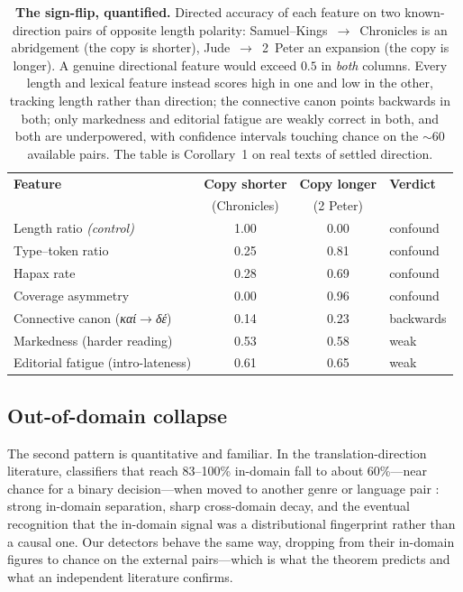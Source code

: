 \documentclass[11pt,letterpaper]{article}
\newcommand{\gk}[1]{{\greekfont\itshape #1}}
\newcommand{\tblhead}{\rowcolor{marine!12}}
\begin{document}
\begin{table}[H]
\centering\small
\begin{tabular}{L{5.0cm}ccl}
\toprule
\tblhead\textbf{Feature} & \textbf{Copy shorter} & \textbf{Copy longer} & \textbf{Verdict} \\
\tblhead & \footnotesize (Chronicles) & \footnotesize (2 Peter) & \\
\midrule
Length ratio \emph{(control)} & 1.00 & 0.00 & confound \\
Type--token ratio & 0.25 & 0.81 & confound \\
Hapax rate & 0.28 & 0.69 & confound \\
Coverage asymmetry & 0.00 & 0.96 & confound \\
Connective canon (\gk{καί}$\to$\gk{δέ}) & 0.14 & 0.23 & backwards \\
Markedness (harder reading) & 0.53 & 0.58 & weak \\
Editorial fatigue (intro-lateness) & 0.61 & 0.65 & weak \\
\bottomrule
\end{tabular}
\caption{\textbf{The sign-flip, quantified.} Directed accuracy of each feature on two known-direction pairs of opposite length polarity: Samuel--Kings~$\to$~Chronicles is an abridgement (the copy is shorter), Jude~$\to$~2~Peter an expansion (the copy is longer). A genuine directional feature would exceed $0.5$ in \emph{both} columns. Every length and lexical feature instead scores high in one and low in the other, tracking length rather than direction; the connective canon points backwards in both; only markedness and editorial fatigue are weakly correct in both, and both are underpowered, with confidence intervals touching chance on the $\sim$60 available pairs. The table is Corollary~1 on real texts of settled direction.}
\label{tab:signflip}
\end{table}

\subsection{Out-of-domain collapse}

The second pattern is quantitative and familiar. In the translation-direction literature, classifiers that reach 83--100\% in-domain fall to about 60\%---near chance for a binary decision---when moved to another genre or language pair \citep{rabinovich2015,sominsky2019}: strong in-domain separation, sharp cross-domain decay, and the eventual recognition that the in-domain signal was a distributional fingerprint rather than a causal one. Our detectors behave the same way, dropping from their in-domain figures to chance on the external pairs---which is what the theorem predicts and what an independent literature confirms.
\end{document}
